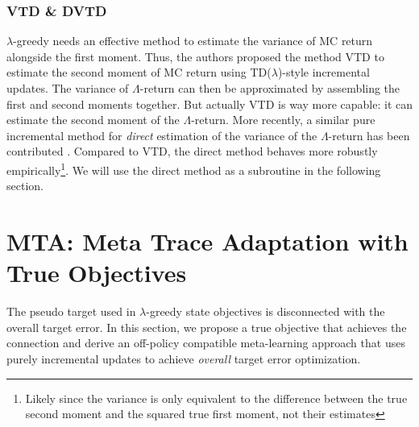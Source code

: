 \documentclass{article}
\begin{document}
\subsubsection{VTD \& DVTD}
$\lambda$-greedy needs an effective method to estimate the variance of MC return alongside the first moment. Thus, the authors proposed the method VTD to estimate the second moment of MC return using TD($\lambda$)-style incremental updates. The variance of $\Lambda$-return can then be approximated by assembling the first and second moments together. But actually VTD is way more capable: it can estimate the second moment of the $\Lambda$-return. More recently, a similar pure incremental method for \textit{direct} estimation of the variance of the $\Lambda$-return has been contributed \cite{sherstan2018directly}. Compared to VTD, the direct method behaves more robustly empirically\footnote{Likely since the variance is only equivalent to the difference between the true second moment and the squared true first moment, not their estimates}. We will use the direct method as a subroutine in the following section.

\section{MTA: Meta Trace Adaptation with True Objectives}\label{sec:MTA}
The pseudo target used in $\lambda$-greedy state objectives is disconnected with the overall target error. In this section, we propose a true objective that achieves the connection and derive an off-policy compatible meta-learning approach that uses purely incremental updates to achieve \textit{overall} target error optimization.
\end{document}
